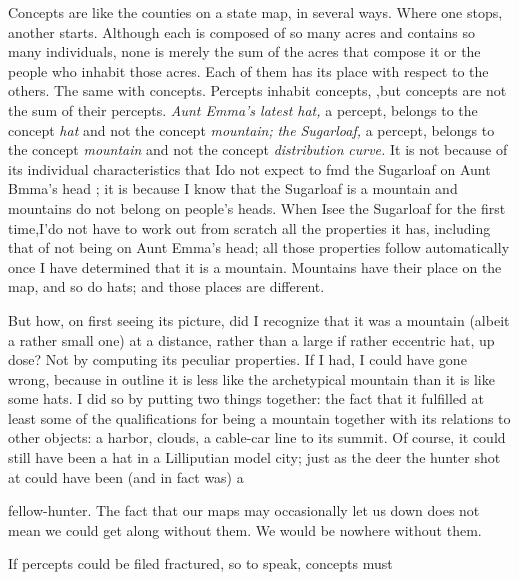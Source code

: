 Concepts are like the counties on a state map, in several ways. Where one stops, another starts. Although each is composed of so many acres and contains so many individuals, none is merely the sum of the acres that compose it or the people who inhabit those acres. Each of them has its place with respect to the others. The same with con\-cepts. Percepts inhabit concepts, ,but concepts are not the sum of their percepts. \textit{Aunt Emma's latest hat,} a percept, belongs to the concept \textit{hat} and not the concept \textit{mountain;} \textit{the} \textit{Sugarloaf,} a percept, belongs to the concept \textit{mountain }and not the concept \textit{distribution} \textit{curve.} It is not because of its individual characteristics that Ido not expect to fmd the Sugarloaf on Aunt Bmma's head ; it is because I know that the Sugarloaf is a mountain and mountains do not belong on people's heads. When Isee the Sugarloaf for the first time,I'do not have to work out from scratch all the properties it has, including that of not being on Aunt Emma's head; all those properties follow auto\-matically once I have determined that it is a mountain. Mountains have their place on the map, and so do hats; and those places are different.

But how, on first seeing its picture, did I recognize that it was a mountain (albeit a rather small one) at a distance, rather than a large if rather eccentric hat, up dose? Not by computing its peculiar proper\-ties. If I had, I could have gone wrong, because in outline it is less like the archetypical mountain than it is like some hats. I did so by putting two things together: the fact that it fulfilled at least some of the qualifications for being a mountain together with its relations to other objects: a harbor, clouds, a cable-car line to its summit. Of course, it could still have been a hat in a Lilliputian model city; just as the deer the hunter shot at could have been (and in fact was) a


fellow-hunter. The fact that our maps may occasionally let us down does not mean we could get along without them. We would be no\-where without them.

If percepts could be filed fractured, so to speak, concepts must

